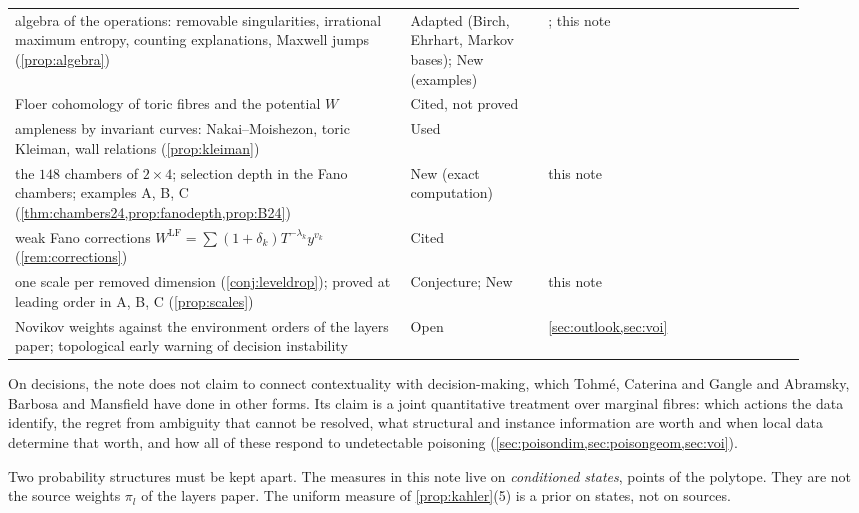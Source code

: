 \documentclass[11pt]{article}
\theoremstyle{definition}\newtheorem{definition}[theorem]{Definition}\newtheorem{remark}[theorem]{Remark}\newtheorem{example}[theorem]{Example}\newtheorem{problem}[theorem]{Open problem}\crefname{problem}{Problem}{Problems}
\begin{document}
{\begin{longtable}{p{0.46\linewidth}p{0.16\linewidth}p{0.3\linewidth}}
\rowcolor{stAdapted} algebra of the operations: removable singularities, irrational maximum entropy, counting explanations, Maxwell jumps (\cref{prop:algebra}) & Adapted (Birch, Ehrhart, Markov bases); New (examples) & \cite{DrtonSturmfelsSullivant2009,BeckRobins2015,DiaconisSturmfels1998}; this note\\
\rowcolor{stCited} Floer cohomology of toric fibres and the potential $W$ & Cited, not proved & \cite{ChoOh2006,FOOO2010}\\
\rowcolor{stUsed} ampleness by invariant curves: Nakai--Moishezon, toric Kleiman, wall relations (\cref{prop:kleiman}) & Used & \cite{Kleiman1966,CLS2011}\\
\rowcolor{stNew} the $148$ chambers of $2\times4$; selection depth in the Fano chambers; examples A, B, C (\cref{thm:chambers24,prop:fanodepth,prop:B24}) & New (exact computation) & this note\\
\rowcolor{stCited} weak Fano corrections $W^{\mathrm{LF}}=\sum(1+\delta_k)T^{-\lambda_k}y^{v_k}$ (\cref{rem:corrections}) & Cited & \cite{CLLT2020}\\
\rowcolor{stNew} one scale per removed dimension (\cref{conj:leveldrop}); proved at leading order in A, B, C (\cref{prop:scales}) & Conjecture; New & this note\\
Novikov weights against the environment orders of the layers paper; topological early warning of decision instability & Open & \cref{sec:outlook,sec:voi}\\\bottomrule
\end{longtable}}
On decisions, the note does not claim to connect contextuality with decision-making, which Tohm\'e, Caterina and Gangle and Abramsky, Barbosa and Mansfield have done in other forms. Its claim is a joint quantitative treatment over marginal fibres: which actions the data identify, the regret from ambiguity that cannot be resolved, what structural and instance information are worth and when local data determine that worth, and how all of these respond to undetectable poisoning (\cref{sec:poisondim,sec:poisongeom,sec:voi}).

Two probability structures must be kept apart. The measures in this note live on \emph{conditioned states}, points of the polytope. They
are not the source weights $\pi_l$ of the layers paper. The uniform measure of \cref{prop:kahler}(5) is a prior on states, not on sources.
\end{document}
